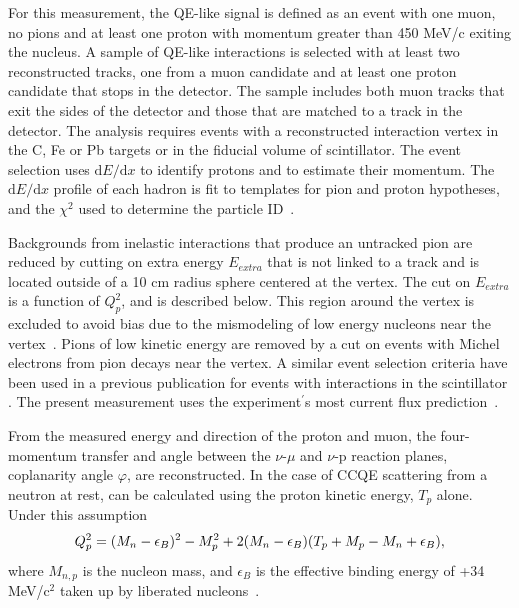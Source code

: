 For this measurement, the QE-like signal is defined as an event with one muon, no pions and at least one proton with momentum greater than 450 MeV/c exiting the nucleus. A sample of QE-like interactions is selected with at least two reconstructed tracks, one from a muon candidate and at least one proton candidate that stops in the detector. The sample includes both muon tracks that exit the sides of the \minerva detector and those that are matched to a track in the \minos detector. The analysis requires events with a reconstructed interaction vertex in the C, Fe or Pb targets or in the fiducial volume of scintillator.  The event selection uses $\mathrm{d}E/\mathrm{d}x$ to identify protons and to estimate their momentum. The $\mathrm{d}E/\mathrm{d}x$ profile of each hadron is fit to templates for pion and proton hypotheses, and the $\chi^2$ used to determine the particle ID~\cite{Twalton-thesis}.

 Backgrounds from inelastic interactions that produce an untracked pion are reduced by cutting on extra energy $E_{extra}$ that is not linked to a track and is located outside of a 10 cm radius sphere centered at the vertex. The cut on $E_{extra}$ is a function of $Q^2_p$, and is described below. This region around the vertex is excluded to avoid bias due to the mismodeling of low energy nucleons near the vertex~\cite{PhysRevLett.111.022502}. Pions of low kinetic energy are removed by a cut on events with Michel electrons from pion decays near the vertex. A similar event selection criteria have been used in a previous publication for events with interactions in the scintillator \cite{Walton:2014esl}. The present measurement uses the experiment$^{'}$s most current flux prediction~\cite{Aliaga:2013uqz}.

From the measured energy and direction of the proton and muon, the four-momentum transfer \QSqproton and angle between the $\nu$-$\mu$ and $\nu$-p reaction planes, coplanarity angle $\varphi$, are reconstructed.
In the case of CCQE scattering from a neutron at rest, \QSqproton can be calculated using the proton kinetic energy, $T_p$ alone.  Under this assumption
\begin{equation*}
Q^{2}_{p}=(M_{n}-\epsilon_B)^2-M^2_{p}+2(M_{n}-\epsilon_{B})(T_{p}+M_{p}-M_{n}+\epsilon_{B}),
\end{equation*}
where $M_{n,p}$ is the nucleon mass, and $\epsilon_B$ is the effective binding energy of +34 MeV/c$^2$ taken up by liberated nucleons~\cite{Moniz:1971mt}. 

